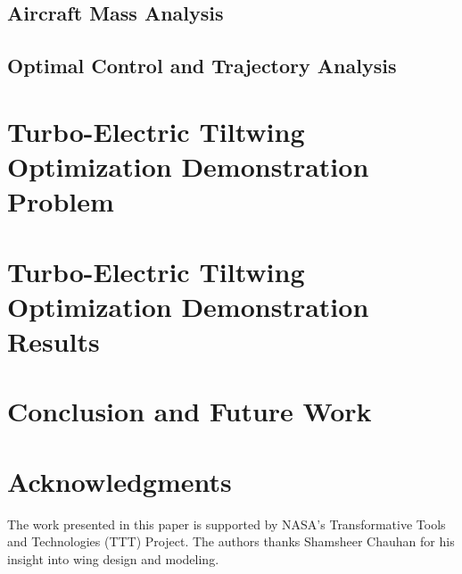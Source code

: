 \documentclass[conf]{new-aiaa}
\begin{document}
\subsection{Aircraft Mass Analysis}

\subsection{Optimal Control and Trajectory Analysis}



\section{Turbo-Electric Tiltwing Optimization Demonstration Problem}\label{sec:opt_prob}

\section{Turbo-Electric Tiltwing Optimization Demonstration Results}\label{sec:opt_results}

\section{Conclusion and Future Work}\label{sec:conc}


\section*{Acknowledgments}
The work presented in this paper is supported by NASA's Transformative Tools and Technologies (TTT) Project.
The authors thanks Shamsheer Chauhan for his insight into wing design and modeling.


\end{document}
